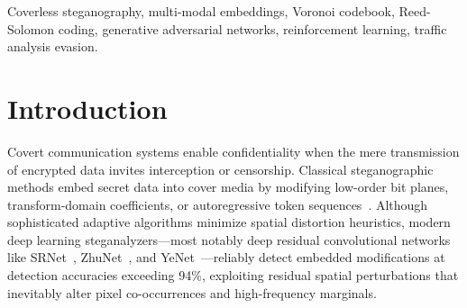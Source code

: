 \documentclass[conference]{IEEEtran}
\begin{document}
\begin{abstract}
We evaluate DCASS across five orthogonal threat dimensions under an audited empirical protocol. Against deep residual steganalyzers trained to detect spatial perturbations at 93.7\% to 95.1\% accuracy, DCASS carriers yield chance-level detection with measured receiver operating characteristic area under curve values between 0.4973 and 0.4993, with every 95\% confidence interval spanning 0.5000. In semantic distributional tests across 1,536 coordinate dimensions, zero coordinates reject under Benjamini-Hochberg false discovery control, and cluster histograms confirm alignment with the system structural mechanism at permutation $p = 0.208$. The dynamic codec delivers 13.50 to 13.66 coded bits per carrier, representing a 40.7\% to 49.9\% carrier reduction relative to exact Voronoi baseline schemes, with user payload capacity scaling up to 12.90 bits per carrier, while achieving zero false acceptances across 356 wrong-key forgery tests. Evaluated against a calibrated network traffic sequence detector trained on authentic human conversation sessions from public community discussion data, the closed-loop reinforcement learning scheduler achieves 76.0\% evasion at 5.63 seconds mean latency with zero channel cooldown violations, whereas static, Poisson, and unguided generative baselines are intercepted at 100\%.
\end{abstract}

\begin{IEEEkeywords}
Coverless steganography, multi-modal embeddings, Voronoi codebook, Reed-Solomon coding, generative adversarial networks, reinforcement learning, traffic analysis evasion.
\end{IEEEkeywords}

\section{Introduction}

Covert communication systems enable confidentiality when the mere transmission of encrypted data invites interception or censorship. Classical steganographic methods embed secret data into cover media by modifying low-order bit planes, transform-domain coefficients, or autoregressive token sequences~\cite{provos2003hide,fridrich2009steganography}. Although sophisticated adaptive algorithms minimize spatial distortion heuristics, modern deep learning steganalyzers—most notably deep residual convolutional networks like SRNet~\cite{boroumand2018deep}, ZhuNet~\cite{zhang2019run}, and YeNet~\cite{ye2017deep}—reliably detect embedded modifications at detection accuracies exceeding 94\%, exploiting residual spatial perturbations that inevitably alter pixel co-occurrences and high-frequency marginals.
\end{document}
